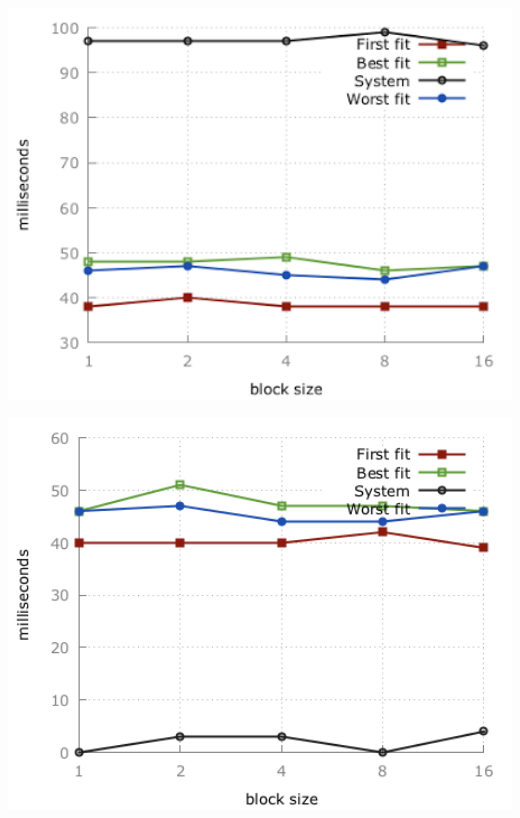 \documentclass[paper=a4, fontsize=11pt]{scrartcl} %
\numberwithin{equation}{section} %
\numberwithin{figure}{section} %
\numberwithin{table}{section} %
\begin{document}
\begin{minipage}{.5\textwidth}
    \centering
    \includegraphics[width=1\textwidth]{images/time_plot_small1.png}
    \label{fig:p1}
\end{minipage}%
\begin{minipage}{.5\textwidth}
    \centering
    \includegraphics[width=1\textwidth]{images/time_plot_small2.png}
    \label{fig:p2}
\end{minipage}\\\\
\end{document}
